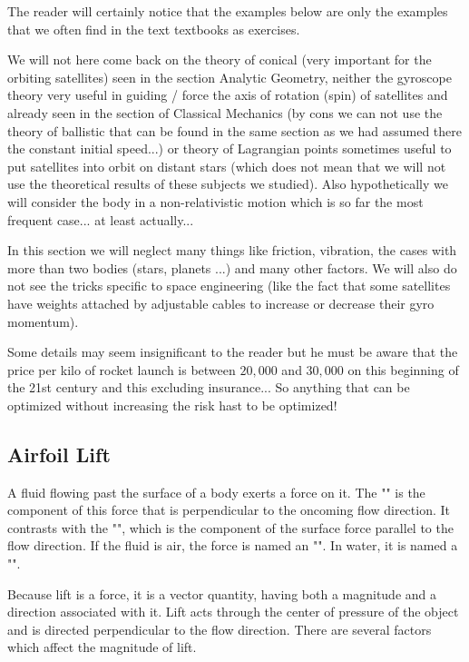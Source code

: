 	The reader will certainly notice that the examples below are only the examples that we often find in the text textbooks as exercises.
	
	We will not here come back on the theory of conical (very important for the orbiting satellites) seen in the section Analytic Geometry, neither the gyroscope theory very useful in guiding / force the axis of rotation (spin) of satellites and already seen in the section of Classical Mechanics (by cons we can not use the theory of ballistic that can be found in the same section as we had assumed there the constant initial speed...) or theory of Lagrangian points sometimes useful to put satellites into orbit on distant stars (which does not mean that we will not use the theoretical results of these subjects we studied). Also hypothetically we will consider the body in a non-relativistic motion which is so far the most frequent case... at least actually...
	
	In this section we will neglect many things like friction, vibration, the cases with more than two bodies (stars, planets ...) and many other factors. We will also do not see the tricks specific to space engineering (like the fact that some satellites have weights attached by adjustable cables to increase or decrease their gyro momentum).
	\begin{tcolorbox}[title=Remark,colframe=black,arc=10pt]
	Some details may seem insignificant to the reader but he must be aware that the price per kilo of rocket launch is between $20,000$ and $30,000$ on this beginning of the 21st century and this excluding insurance... So anything that can be optimized without increasing the risk hast to be optimized!
	\end{tcolorbox}
	
	\pagebreak
	\subsection{Airfoil Lift}
	A fluid flowing past the surface of a body exerts a force on it. The "" is the component of this force that is perpendicular to the oncoming flow direction. It contrasts with the "", which is the component of the surface force parallel to the flow direction. If the fluid is air, the force is named an "". In water, it is named a "".
	
	Because lift is a force, it is a vector quantity, having both a magnitude and a direction associated with it. Lift acts through the center of pressure of the object and is directed perpendicular to the flow direction. There are several factors which affect the magnitude of lift.
	
